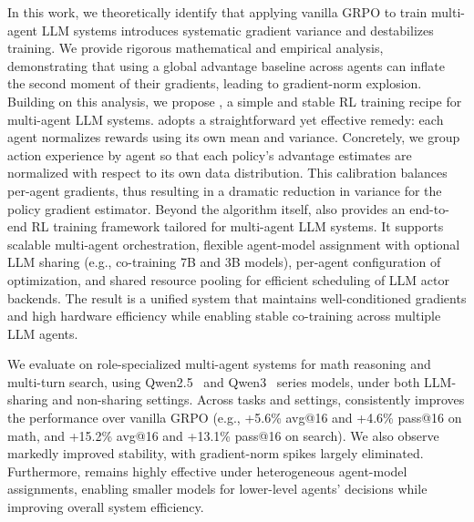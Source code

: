 In this work, we theoretically identify that applying vanilla GRPO to train multi-agent LLM systems introduces systematic gradient variance and destabilizes training. We provide rigorous mathematical and empirical analysis, demonstrating that using a global advantage baseline across agents can inflate the second moment of their gradients, leading to gradient-norm explosion. 
Building on this analysis, we propose \methodname{}, a simple and stable RL training recipe for multi-agent LLM systems. \methodname{} adopts a straightforward yet effective remedy: each agent normalizes rewards using its own mean and variance. Concretely, we group action experience by agent so that each policy’s advantage estimates are normalized with respect to its own data distribution.
This calibration balances per-agent gradients, thus resulting in a dramatic reduction in variance for the policy gradient estimator. Beyond the algorithm itself, \methodname{} also provides an end-to-end RL training framework tailored for multi-agent LLM systems. It supports scalable multi-agent orchestration, flexible agent-model assignment with optional LLM sharing (e.g., co-training 7B and 3B models), per-agent configuration of optimization, and shared resource pooling for efficient scheduling of LLM actor backends. The result is a unified system that maintains well-conditioned gradients and high hardware efficiency while enabling stable co-training across multiple LLM agents.

We evaluate \methodname{} on role-specialized multi-agent systems for math reasoning and multi-turn search, using Qwen2.5~\citep{bai2025qwen2} and Qwen3~\citep{yang2025qwen3} series models, under both LLM-sharing and non-sharing settings. Across tasks and settings, \methodname{} consistently improves the performance over vanilla GRPO (e.g., +5.6\% avg@16 and +4.6\% pass@16 on math, and +15.2\% avg@16 and +13.1\% pass@16 on search). We also observe markedly improved stability, with gradient-norm spikes largely eliminated. Furthermore, \methodname{} remains highly effective under heterogeneous agent-model assignments, enabling smaller models for lower-level agents' decisions while improving overall system efficiency. 



